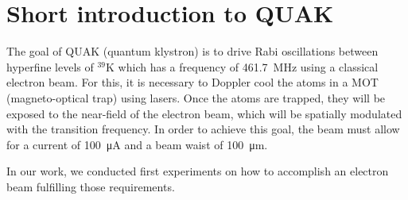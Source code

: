 
\chapter{Short introduction to QUAK}
\label{ch:Short introduction to QuaK}

The goal of QUAK (quantum klystron) is to drive Rabi oscillations between hyperfine levels of $^{39}\mathrm{K}$ which has a frequency of \SI{461.7}{\mega\hertz} \cite{tiecke:K-frequency} using a classical electron beam. For this, it is necessary to Doppler cool the atoms in a MOT (magneto-optical trap) using lasers. Once the atoms are trapped, they will be exposed to the near-field of the electron beam, which will be spatially modulated with the transition frequency. In order to achieve this goal, the beam must allow for a current of \SI{100}{\micro\ampere}
and a beam waist of \SI{100}{\micro\meter}.

In our work, we conducted first experiments on how to accomplish an electron beam fulfilling those requirements.